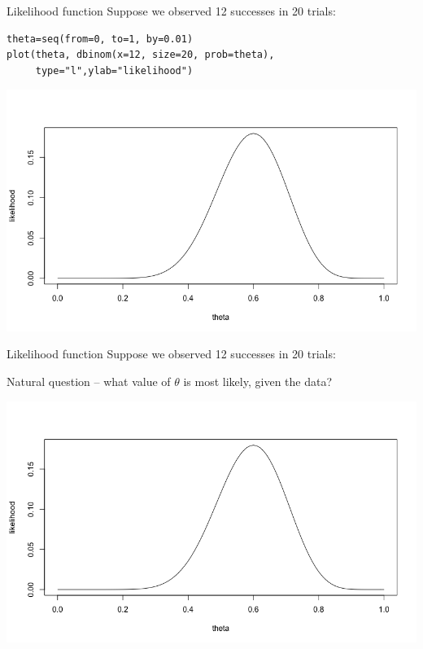 \documentclass[presentation]{beamer}
\begin{document}
\begin{frame}[fragile,label=sec-5]{Likelihood function}
 Suppose we observed 12 successes in 20 trials:

\begin{verbatim}
theta=seq(from=0, to=1, by=0.01)
plot(theta, dbinom(x=12, size=20, prob=theta), 
     type="l",ylab="likelihood")
\end{verbatim}

\includegraphics[width=.9\linewidth]{figures/week2/likelihood.png}
\end{frame}

\begin{frame}[label=sec-6]{Likelihood function}
Suppose we observed 12 successes in 20 trials:

\vspace{1cm}

Natural question -- what value of $\theta$ is \alert{most likely}, given the data?

\includegraphics[width=.9\linewidth]{figures/week2/likelihood.png}
\end{frame}
\end{document}
